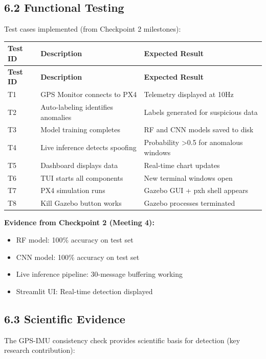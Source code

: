 \documentclass[12pt,a4paper]{article}
\begin{document}
\subsection{6.2 Functional Testing}

Test cases implemented (from Checkpoint 2 milestones):

\begin{longtable}{|p{3cm}|p{4cm}|p{8cm}|}
\hline
\textbf{Test ID} & \textbf{Description} & \textbf{Expected Result} \\
\hline
\endfirsthead
\hline
\textbf{Test ID} & \textbf{Description} & \textbf{Expected Result} \\
\hline
\endhead
\hline
T1 & GPS Monitor connects to PX4 & Telemetry displayed at 10Hz \\
\hline
T2 & Auto-labeling identifies anomalies & Labels generated for suspicious data \\
\hline
T3 & Model training completes & RF and CNN models saved to disk \\
\hline
T4 & Live inference detects spoofing & Probability >0.5 for anomalous windows \\
\hline
T5 & Dashboard displays data & Real-time chart updates \\
\hline
T6 & TUI starts all components & New terminal windows open \\
\hline
T7 & PX4 simulation runs & Gazebo GUI + pxh shell appears \\
\hline
T8 & Kill Gazebo button works & Gazebo processes terminated \\
\hline
\end{longtable}

\textbf{Evidence from Checkpoint 2 (Meeting 4):}
\begin{itemize}
    \item RF model: 100\% accuracy on test set
    \item CNN model: 100\% accuracy on test set
    \item Live inference pipeline: 30-message buffering working
    \item Streamlit UI: Real-time detection displayed
\end{itemize}

\subsection{6.3 Scientific Evidence}

The GPS-IMU consistency check provides scientific basis for detection (key research contribution):
\end{document}
